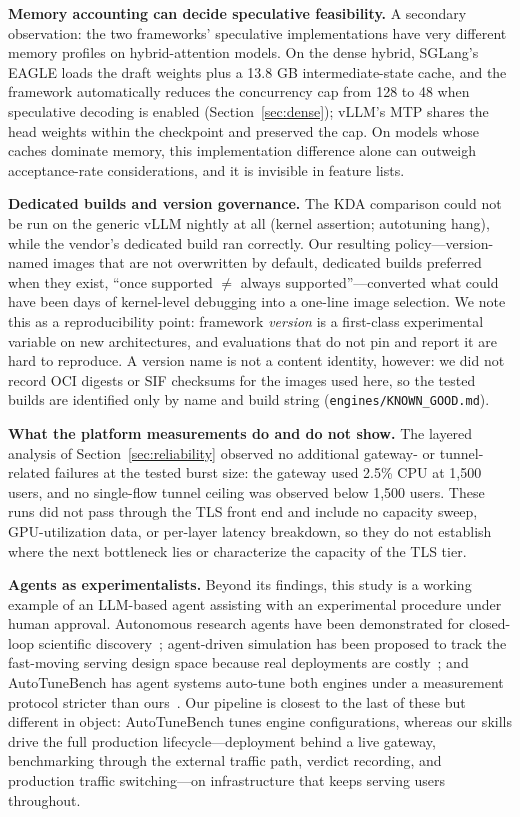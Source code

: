 \documentclass[11pt]{article}
\begin{document}
\textbf{Memory accounting can decide speculative feasibility.} A secondary observation: the two frameworks' speculative implementations have very different memory profiles on hybrid-attention models. On the dense hybrid, SGLang's EAGLE loads the draft weights plus a 13.8 GB intermediate-state cache, and the framework automatically reduces the concurrency cap from 128 to 48 when speculative decoding is enabled (Section~\ref{sec:dense}); vLLM's MTP shares the head weights within the checkpoint and preserved the cap. On models whose caches dominate memory, this implementation difference alone can outweigh acceptance-rate considerations, and it is invisible in feature lists.

\textbf{Dedicated builds and version governance.} The KDA comparison could not be run on the generic vLLM nightly at all (kernel assertion; autotuning hang), while the vendor's dedicated build ran correctly. Our resulting policy---version-named images that are not overwritten by default, dedicated builds preferred when they exist, ``once supported $\ne$ always supported''---converted what could have been days of kernel-level debugging into a one-line image selection. We note this as a reproducibility point: framework \emph{version} is a first-class experimental variable on new architectures, and evaluations that do not pin and report it are hard to reproduce. A version name is not a content identity, however: we did not record OCI digests or SIF checksums for the images used here, so the tested builds are identified only by name and build string (\texttt{engines/KNOWN\_GOOD.md}).

\textbf{What the platform measurements do and do not show.} The layered analysis of Section~\ref{sec:reliability} observed no additional gateway- or tunnel-related failures at the tested burst size: the gateway used 2.5\% CPU at 1,500 users, and no single-flow tunnel ceiling was observed below 1,500 users. These runs did not pass through the TLS front end and include no capacity sweep, GPU-utilization data, or per-layer latency breakdown, so they do not establish where the next bottleneck lies or characterize the capacity of the TLS tier.

\textbf{Agents as experimentalists.} Beyond its findings, this study is a working example of an LLM-based agent assisting with an experimental procedure under human approval. Autonomous research agents have been demonstrated for closed-loop scientific discovery~\cite{lu2024aiscientist}; agent-driven simulation has been proposed to track the fast-moving serving design space because real deployments are costly~\cite{kim2026simthesizer}; and AutoTuneBench has agent systems auto-tune both engines under a measurement protocol stricter than ours~\cite{chen2026autotunebench}. Our pipeline is closest to the last of these but different in object: AutoTuneBench tunes engine configurations, whereas our skills drive the full production lifecycle---deployment behind a live gateway, benchmarking through the external traffic path, verdict recording, and production traffic switching---on infrastructure that keeps serving users throughout.
\end{document}

